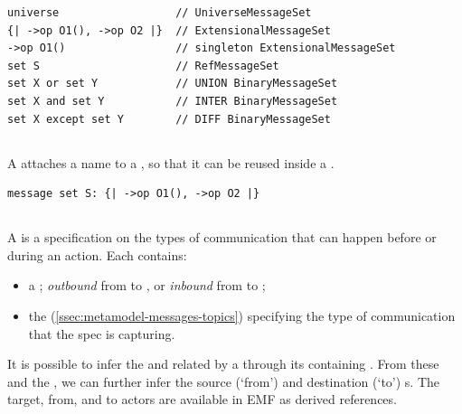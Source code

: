\begin{lstlisting}[style=Example]
universe                  // UniverseMessageSet
{| ->op O1(), ->op O2 |}  // ExtensionalMessageSet
->op O1()                 // singleton ExtensionalMessageSet
set S                     // RefMessageSet
set X or set Y            // UNION BinaryMessageSet
set X and set Y           // INTER BinaryMessageSet
set X except set Y        // DIFF BinaryMessageSet
\end{lstlisting}

\subsection{\mnamedmessageset}\label{ssec:metamodel-messages-named-sets}

A \mnamedmessageset{} attaches a name to a \mmessageset, so that it can be reused
inside a \msequence.

\begin{lstlisting}[style=Example]
message set S: {| ->op O1(), ->op O2 |}
\end{lstlisting}

\subsection{\mmessagespec}

A \mmessagespec{} is a specification on the types of communication that can
happen before or during an action.  Each \mmessagespec{} contains:

\begin{itemize}
\item
  a \mmessagedirection; \emph{outbound} from \mtarget{} to \mworld,
  or \emph{inbound} from \mworld{} to \mtarget;
\item
  the \mmessagetopic{} (\cref{ssec:metamodel-messages-topics}) specifying
  the type of communication that the spec is capturing.
\end{itemize}

It is possible to infer the \mtarget{} and \mworld{} related by a
\mmessagespec{} through its containing \msequencegroup.  From these
and the \mmessagedirection, we can further infer the source (`from')
and destination (`to') \mactor s.  The target, from, and to actors are
available in EMF as derived references.

